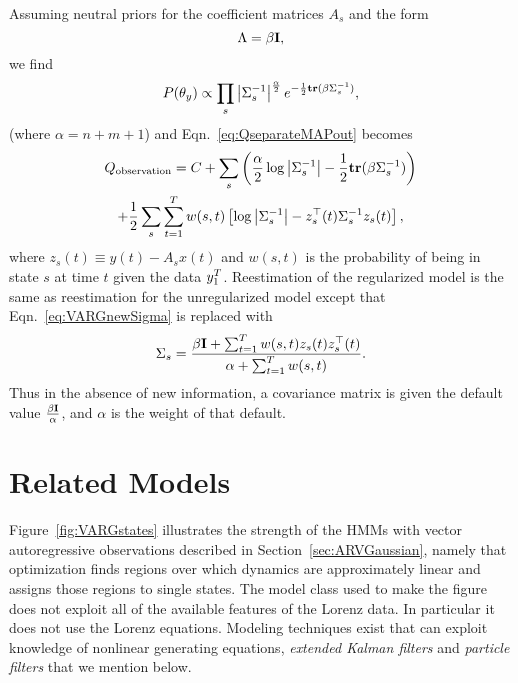 Assuming neutral priors for the coefficient matrices $A_s$ and the
form
\begin{equation*}
  \Lambda = \beta {\bf I},
\end{equation*}
we find
\begin{equation*}
  P(\theta_y) \propto \prod_s \left| \Sigma_s^{-1}
                    \right|^{\frac{\alpha}{2}}
                    e^{-\frac{1}{2} {\bf tr}(\beta \Sigma_s^{-1})},
\end{equation*}
(where $\alpha = n+m+1$) and Eqn.~\ref{eq:QseparateMAPout} becomes
\begin{multline*}
  \label{eq:QVARG1}
  Q_{\text{observation}} = C + \sum_s \left( \frac{\alpha}{2}\log\left|
      \Sigma_s^{-1}\right| - \frac{1}{2} {\bf tr}(\beta
    \Sigma_s^{-1}) \right) \\
  + \frac{1}{2} \sum_s \sum_{t=1}^T w(s,t) \left[ \log \left|
      \Sigma_s^{-1} \right| - z_s^\top(t) \Sigma_s^{-1} z_s(t)\right],
\end{multline*}
where $z_s(t) \equiv y(t) - A_s x(t)$ and $w(s,t)$ is the probability
of being in state $s$ at time $t$ given the data $y_{1}^{T}$.
Reestimation of the regularized model is the same as reestimation for
the unregularized model except that Eqn.~\ref{eq:VARGnewSigma} is
replaced with
\begin{equation}\label{eq:NewSigma}
  \Sigma_s = \frac{\beta {\bf I} + \sum_{t=1}^T w(s,t) z_s(t)
    z_s^\top(t)} {\alpha + \sum_{t=1}^T w(s,t)}.
\end{equation}
Thus in the absence of new information, a covariance matrix is given
the default value $\frac{\beta {\bf I}}{\alpha}$, and $\alpha$ is the
weight of that default.

\section{Related Models}
\label{sec:related}

Figure~\ref{fig:VARGstates} illustrates the strength of the HMMs with
vector autoregressive observations described in
Section~\ref{sec:ARVGaussian}, namely that optimization finds regions
over which dynamics are approximately linear and assigns those regions
to single states.  The model class used to make the figure does not
exploit all of the available features of the Lorenz data.  In
particular it does not use the Lorenz equations.  Modeling techniques
exist that can exploit knowledge of nonlinear generating equations,
\eg \emph{extended Kalman filters} and \emph{particle filters} that we
mention below.

